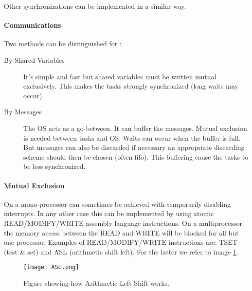 Other synchronizations can be implemented in a similar way.

\paragraph{Communications}
Two methods can be distinguished for :
\begin{description}
	\item[By Shared Variables] It's simple and fast but shared variables must be written mutual exclusively. This makes the tasks strongly synchronized (long waits may occur).
	\item[By Messages] The OS acts as a go-between. It can buffer the messages. Mutual exclusion is needed between tasks and OS. Waits can occur when the buffer is full. But messages can also be discarded if necessary an appropriate discarding scheme should then be chosen (often fifo). This buffering cause the tasks to be less synchronized.
\end{description} 


\paragraph{Mutual Exclusion}
On a mono-processor  can sometimes be achieved with temporarily disabling interrupts.
In any other case this can be implemented by using atomic READ/MODIFY/WRITE assembly language instructions.
On a multiprocessor the memory access between the READ and WRITE will be blocked for all but one processor.
Examples of READ/MODIFY/WRITE instructions are: TSET (test \& set) and ASL (arithmetic shift left). 
For the latter we refer to image \ref{f:asl}. 

\begin{figure}
	\centering
	\texttt{[image: ASL.png]}
	\caption{Figure showing how Arithmetic Left Shift works.}
	\label{f:asl}
\end{figure}

